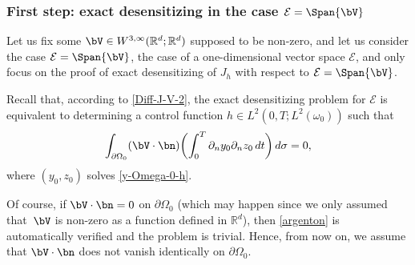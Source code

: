 \subsubsection*{First step: exact desensitizing in the case $\mathcal{E}=\Span \{\bV\}$}
Let us fix some $\bV\in W^{3,\infty}(\mathbb R^d;\mathbb R^d)$ supposed to be non-zero, and let us consider the case $\mathcal{E}=\Span \{\bV\}$, \ie the case of a one-dimensional vector space $\mathcal{E}$, and only focus on the proof of exact desensitizing of $J_h$ with respect to $\mathcal{E} = \Span \{\bV\}$.

Recall that, according to \eqref{Diff-J-V-2}, the exact desensitizing problem for $\mathcal{E}$ is equivalent to determining a control function $h \in L^2(0,T; L^2(\omega_0))$ such that
\begin{equation}
\label{argenton}
\int_{\partial\Omega_{0}}(\bV\cdot \bn)
\biggl(\int_{0}^{T}\partial_{n}y_{0}\partial_{n} z_{0}\, dt \biggr)\,
d\sigma
=0,
\end{equation}
where $(y_0,z_0)$ solves \eqref{y-Omega-0-h}.

Of course, if $\bV\cdot \bn=0$ on $\partial\Omega_0$ (which may happen since we only assumed that~$\bV $ is non-zero as a function defined in $\mathbb R^d$), then \eqref{argenton} is automatically verified and the problem is trivial. Hence, from now on, we assume that $\bV\cdot \bn$ does not vanish {identically} on $\partial\Omega_0$.

